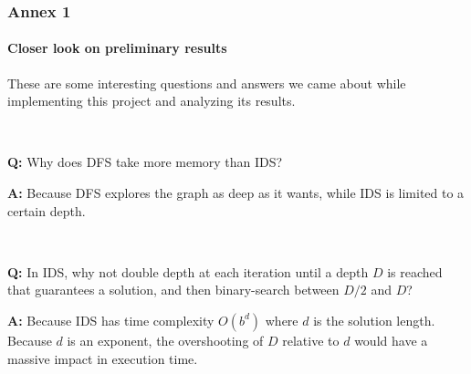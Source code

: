 \documentclass{beamer}
\begin{document}
\begin{frame}
  \frametitle{Annex 1}
  \framesubtitle{Closer look on preliminary results}

  These are some interesting questions and answers we came about while implementing this project and analyzing its results.

  ~
  
  \textbf{Q:} Why does DFS take more memory than IDS?
  
  \textbf{A:} Because DFS explores the graph as deep as it wants, while IDS is limited to a certain depth.
  
  ~

  \textbf{Q:} In IDS, why not double depth at each iteration until a depth $D$ is reached that guarantees a solution, and then binary-search between $D/2$ and $D$?

  \textbf{A:} Because IDS has time complexity $O(b^d)$ where $d$ is the solution length. Because $d$ is an exponent, the overshooting of $D$ relative to $d$ would have a massive impact in execution time.

\end{frame}
\end{document}
